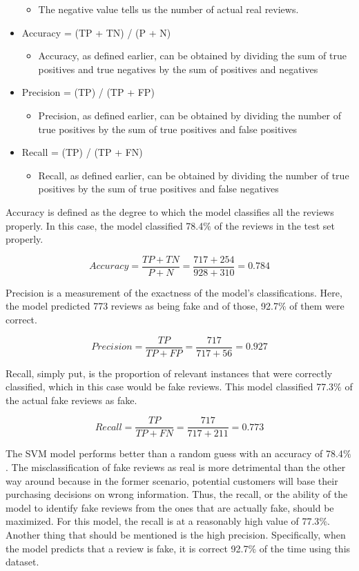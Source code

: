 \documentclass[12pt]{article}
\begin{document}
\begin{itemize}
  \begin{itemize}
    \item{The negative value tells us the number of actual real reviews.}
  \end{itemize}
  \item Accuracy = (TP + TN) / (P + N)
    \begin{itemize}
    \item{Accuracy, as defined earlier, can be obtained by dividing the sum of true positives and true negatives by the sum of positives and negatives}
  \end{itemize}
  \item Precision = (TP) / (TP + FP)
  \begin{itemize}
    \item{Precision, as defined earlier, can be obtained by dividing the number of true positives by the sum of true positives and false positives}
  \end{itemize}
  \item Recall = (TP) / (TP + FN)
  \begin{itemize}
    \item{Recall, as defined earlier, can be obtained by dividing the number of true positives by the sum of true positives and false negatives}
  \end{itemize}
\end{itemize}

Accuracy is defined as the degree to which the model classifies all the reviews properly. In this case, the model classified 78.4$\%$ of the reviews in the test set properly. 

\[Accuracy = \dfrac{TP + TN}{P + N} = \dfrac{717 + 254}{928 + 310} = 0.784\]

Precision is a measurement of the exactness of the model's classifications. Here, the model predicted 773 reviews as being fake and of those, 92.7$\%$ of them were correct.

\[Precision = \dfrac{TP}{TP + FP} = \dfrac{717}{717 + 56} = 0.927\]

Recall, simply put, is the proportion of relevant instances that were correctly classified, which in this case would be fake reviews. This model classified 77.3$\%$ of the actual fake reviews as fake.

\[Recall = \dfrac{TP}{TP + FN} = \dfrac{717}{717 + 211} = 0.773\]

The SVM model performs better than a random guess with an accuracy of 78.4$\%$. The misclassification of fake reviews as real is more detrimental than the other way around because in the former scenario, potential customers will base their purchasing decisions on wrong information. Thus, the recall, or the ability of the model to identify fake reviews from the ones that are actually fake, should be maximized. For this model, the recall is at a reasonably high value of 77.3$\%$. Another thing that should be mentioned is the high precision. Specifically, when the model predicts that a review is fake, it is correct 92.7$\%$ of the time using this dataset.
\end{document}
